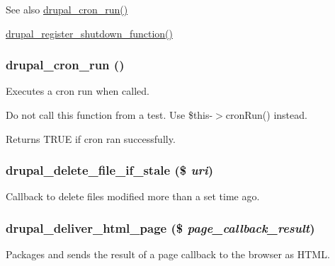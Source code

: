 \begin{DoxySeeAlso}{See also}
\hyperlink{common_8inc_a1d4a4362b30215023a7120b627a9fd4f}{drupal\_\-cron\_\-run()} 

\hyperlink{group__php__wrappers_gac7eaf11b49995f7f539f5c830a65b34f}{drupal\_\-register\_\-shutdown\_\-function()} 
\end{DoxySeeAlso}
\hypertarget{common_8inc_a1d4a4362b30215023a7120b627a9fd4f}{
\subsubsection[{drupal\_\-cron\_\-run}]{\setlength{\rightskip}{0pt plus 5cm}drupal\_\-cron\_\-run ()}}
\label{common_8inc_a1d4a4362b30215023a7120b627a9fd4f}
Executes a cron run when called.

Do not call this function from a test. Use \$this-\/$>$cronRun() instead.

\begin{DoxyReturn}{Returns}
TRUE if cron ran successfully. 
\end{DoxyReturn}
\hypertarget{common_8inc_af70ef23972aa97b49877d5269c8f321c}{
\subsubsection[{drupal\_\-delete\_\-file\_\-if\_\-stale}]{\setlength{\rightskip}{0pt plus 5cm}drupal\_\-delete\_\-file\_\-if\_\-stale (\$ {\em uri})}}
\label{common_8inc_af70ef23972aa97b49877d5269c8f321c}
Callback to delete files modified more than a set time ago. \hypertarget{common_8inc_a05ab0d6e81d6cbe2a6b9f645b9e710ec}{
\subsubsection[{drupal\_\-deliver\_\-html\_\-page}]{\setlength{\rightskip}{0pt plus 5cm}drupal\_\-deliver\_\-html\_\-page (\$ {\em page\_\-callback\_\-result})}}
\label{common_8inc_a05ab0d6e81d6cbe2a6b9f645b9e710ec}
Packages and sends the result of a page callback to the browser as HTML.


